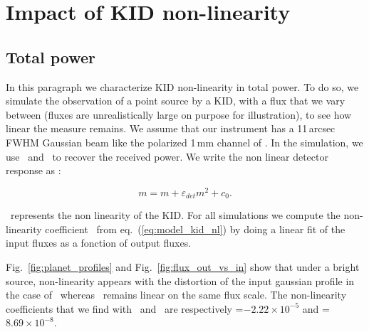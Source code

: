 \section{Impact of KID non-linearity}
\label{se:KID_NL}

\subsection{Total power}

In this paragraph we characterize KID non-linearity in total power. To do so, we simulate the observation of a point source by a KID, with a flux that we vary between  (fluxes are unrealistically large on purpose for illustration), to see how linear the measure remains. We assume that our instrument has a 11\,arcsec FWHM Gaussian beam like the polarized 1\,mm channel of \nikad. In the simulation, we use \methodu\ and  \methodd\ to recover the received power. We write the non linear detector response as :

\begin{equation}
m = m + \varepsilon_{det} m^2 +c_{0}.
\label{eq:model_kid_nl}
\end{equation}

\epsDET\ represents the non linearity of the KID. 
For all simulations we compute the non-linearity coefficient \epsDET\ from eq.~(\ref{eq:model_kid_nl}) by doing a linear fit of the input fluxes as a fonction of output fluxes.

Fig.~\ref{fig:planet_profiles} and Fig.~\ref{fig:flux_out_vs_in} show that under a bright source, non-linearity appears with the distortion of the input gaussian profile in the case of \methodu\ whereas \methodd\ remains linear on the same flux scale. The non-linearity coefficients that we find with \methodu\ and \methodd\ are respectively \epsDET =$-2.22 \times 10^{-5}$ and \epsDET =$8.69 \times 10^{-8}$. 



